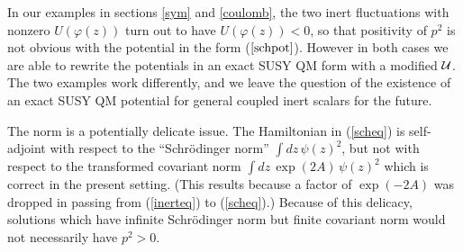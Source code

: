 \documentclass[a4paper,12pt]{article}
\begin{document}
In our examples in sections \ref{sym} and
\ref{coulomb}, the two inert fluctuations with nonzero $U(\varphi(z))$
turn out to have $U(\varphi(z)) < 0$, so that positivity of $p^2$ is
not obvious with the potential in the form ($\ref{schpot}$).  However
in both cases we are able to rewrite the potentials in an exact SUSY
QM form with a modified ${\cal U}$.  The two examples work
differently, and we leave the question of the existence of an exact
SUSY QM potential for general coupled inert scalars for the future.

The norm is a potentially delicate issue.  The Hamiltonian in
(\ref{scheq}) is self-adjoint with respect to the ``Schr\"odinger
norm'' $\int dz \, \psi(z)^2$, but not with respect to the transformed
covariant norm $\int dz \, \exp(2A) \, \psi(z)^2$ which is correct in
the present setting.  (This results because a factor of $\exp(-2A)$
was dropped in passing from (\ref{inerteq}) to (\ref{scheq}).)
Because of this delicacy, solutions which have infinite Schr\"odinger
norm but finite covariant norm would not necessarily have $p^2>0$. 
\end{document}
